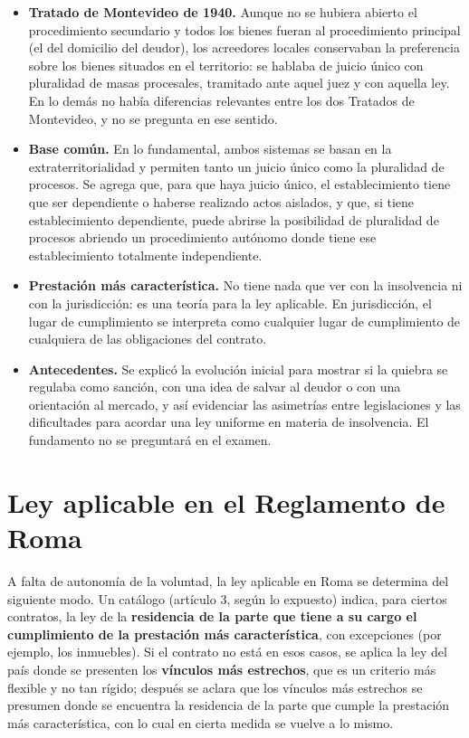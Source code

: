 \documentclass[12pt,oneside]{book}
\begin{document}
\begin{itemize}
    \item \textbf{Tratado de Montevideo de 1940.} Aunque no se hubiera abierto el procedimiento secundario y todos los bienes fueran al procedimiento principal (el del domicilio del deudor), los acreedores locales conservaban la preferencia sobre los bienes situados en el territorio: se hablaba de juicio único con pluralidad de masas procesales, tramitado ante aquel juez y con aquella ley. En lo demás no había diferencias relevantes entre los dos Tratados de Montevideo, y no se pregunta en ese sentido.
    \item \textbf{Base común.} En lo fundamental, ambos sistemas se basan en la extraterritorialidad y permiten tanto un juicio único como la pluralidad de procesos. Se agrega que, para que haya juicio único, el establecimiento tiene que ser dependiente o haberse realizado actos aislados, y que, si tiene establecimiento dependiente, puede abrirse la posibilidad de pluralidad de procesos abriendo un procedimiento autónomo donde tiene ese establecimiento totalmente independiente.
    \item \textbf{Prestación más característica.} No tiene nada que ver con la insolvencia ni con la jurisdicción: es una teoría para la ley aplicable. En jurisdicción, el lugar de cumplimiento se interpreta como cualquier lugar de cumplimiento de cualquiera de las obligaciones del contrato.
    \item \textbf{Antecedentes.} Se explicó la evolución inicial para mostrar si la quiebra se regulaba como sanción, con una idea de salvar al deudor o con una orientación al mercado, y así evidenciar las asimetrías entre legislaciones y las dificultades para acordar una ley uniforme en materia de insolvencia. El fundamento no se preguntará en el examen.
\end{itemize}

\section{Ley aplicable en el Reglamento de Roma}

A falta de autonomía de la voluntad, la ley aplicable en Roma se determina del siguiente modo. Un catálogo (artículo 3, según lo expuesto) indica, para ciertos contratos, la ley de la \textbf{residencia de la parte que tiene a su cargo el cumplimiento de la prestación más característica}, con excepciones (por ejemplo, los inmuebles). Si el contrato no está en esos casos, se aplica la ley del país donde se presenten los \textbf{vínculos más estrechos}, que es un criterio más flexible y no tan rígido; después se aclara que los vínculos más estrechos se presumen donde se encuentra la residencia de la parte que cumple la prestación más característica, con lo cual en cierta medida se vuelve a lo mismo.
\end{document}
